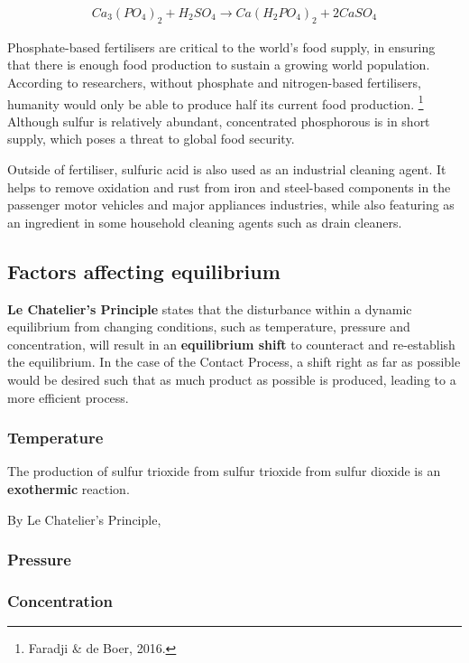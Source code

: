 \documentclass[12pt, a4paper]{article}
\begin{document}
\begin{align}
	Ca_{3}(PO_{4})_{2} + H_{2}SO_{4} \rightarrow Ca(H_{2}PO_{4})_{2} + 2CaSO_{4}
\end{align}

Phosphate-based fertilisers are critical to the world's food supply, in ensuring that there is enough food production to sustain a growing world population. According to researchers, without phosphate and nitrogen-based fertilisers, humanity would only be able to produce half its current food production. \footnote{Faradji \& de Boer, 2016.} Although sulfur is relatively abundant, concentrated phosphorous is in short supply, which poses a threat to global food security.

Outside of fertiliser, sulfuric acid is also used as an industrial cleaning agent. It helps to remove oxidation and rust from iron and steel-based components in the passenger motor vehicles and major appliances industries, while also featuring as an ingredient in some household cleaning agents such as drain cleaners.

\subsection{Factors affecting equilibrium}

\textbf{Le Chatelier's Principle} states that the disturbance within a dynamic equilibrium from changing conditions, such as temperature, pressure and concentration, will result in an \textbf{equilibrium shift} to counteract and re-establish the equilibrium. In the case of the Contact Process, a shift right as far as possible would be desired such that as much product as possible is produced, leading to a more efficient process.

\subsubsection{Temperature}

The production of sulfur trioxide from sulfur trioxide from sulfur dioxide is an \textbf{exothermic} reaction.

By Le Chatelier's Principle, 

\subsubsection{Pressure}

\subsubsection{Concentration}
\end{document}
